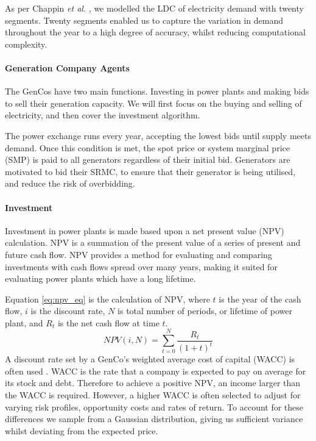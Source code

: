 As per Chappin \textit{et al.} \cite{Chappin2017}, we modelled the LDC of electricity demand with twenty segments. Twenty segments enabled us to capture the variation in demand throughout the year to a high degree of accuracy, whilst reducing computational complexity. 


\paragraph{Generation Company Agents} The GenCos have two main functions. Investing in power plants and making bids to sell their generation capacity. We will first focus on the buying and selling of electricity, and then cover the investment algorithm.

The power exchange runs every year, accepting the lowest bids until supply meets demand. Once this condition is met, the spot price or system marginal price (SMP) is paid to all generators regardless of their initial bid. Generators are motivated to bid their SRMC, to ensure that their generator is being utilised, and reduce the risk of overbidding.

\paragraph{Investment}

Investment in power plants is made based upon a net present value (NPV) calculation. NPV is a summation of the present value of a series of present and future cash flow. NPV provides a method for evaluating and comparing investments with cash flows spread over many years, making it suited for evaluating power plants which have a long lifetime.  

Equation \ref{eq:npv_eq} is the calculation of NPV, where $t$ is the year of the cash flow, $i$ is the discount rate, $N$ is total number of periods, or lifetime of power plant, and $R_t$ is the net cash flow at time $t$.
\begin{equation} \label{eq:npv_eq}
NPV(i, N) = \sum_{t=0}^{N}\frac{R_t}{(1+t)^t}
\end{equation}
A discount rate set by a GenCo's weighted average cost of capital (WACC) is often used \cite{KincheloeStephenC1990TWAC}. WACC is the rate that a company is expected to pay on average for its stock and debt. Therefore to achieve a positive NPV, an income larger than the WACC is required. However, a higher WACC is often selected to adjust for varying risk profiles, opportunity costs and rates of return. To account for these differences we sample from a Gaussian distribution, giving us sufficient variance whilst deviating from the expected price.

